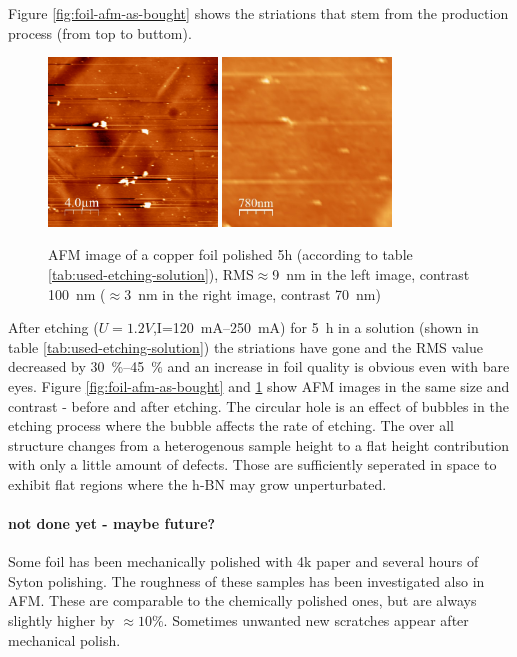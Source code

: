 Figure \ref{fig:foil-afm-as-bought} shows the striations that stem from the production process (from top to buttom).
\begin{figure}[]
	\centering
	\includegraphics[width=0.4\textwidth]{./images/polished0000.jpg}
	\includegraphics[width=0.4\textwidth]{./images/polished0001.jpg}
	\caption{AFM image of a copper foil polished 5h (according to table \ref{tab:used-etching-solution}), RMS$\approx$\SI{9}{\nm} in the left image, contrast \SI{100}{\nm} ($\approx$\SI{3}{\nm} in the right image, contrast \SI{70}{\nm})}
	\label{fig:foil-afm-polished}
\end{figure}
After etching ($U=1.2V$,I=\SIrange{120}{250}{\mA}) for \SI{5}{\hour} in a solution (shown in table \ref{tab:used-etching-solution}) the striations have gone and the RMS value decreased by \SIrange{30}{45}{\percent} and an increase in foil quality is obvious even with bare eyes. Figure \ref{fig:foil-afm-as-bought} and \ref{fig:foil-afm-polished} show AFM images in the same size and contrast - before and after etching.
The circular hole is an effect of bubbles in the etching process where the bubble affects the rate of etching. The over all structure changes from a heterogenous sample height to a flat height contribution with only a little amount of defects. Those are sufficiently seperated in space to exhibit flat regions where the h-BN may grow unperturbated.



\paragraph{not done yet - maybe future?}
Some foil has been mechanically polished with 4k paper and several hours of Syton polishing. The roughness of these samples has been investigated also in AFM. These are comparable to the chemically polished ones, but are always slightly higher by $\approx 10\%$. Sometimes unwanted new scratches appear after mechanical polish.

